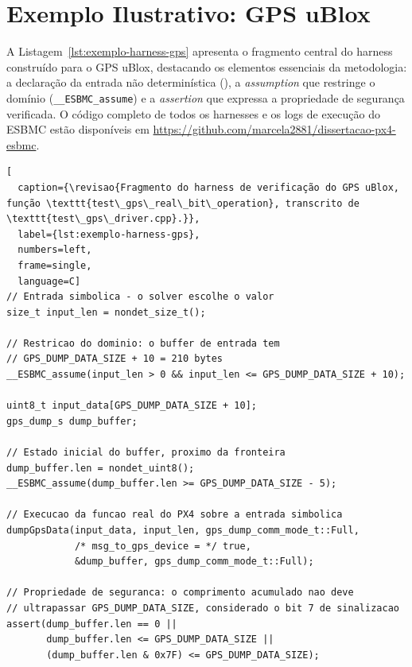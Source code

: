 \section{Exemplo Ilustrativo: GPS uBlox}
\label{sec:exemplo-ilustrativo}


A Listagem~\ref{lst:exemplo-harness-gps} apresenta o fragmento central do harness construído para o GPS uBlox, destacando os elementos essenciais da metodologia: a declaração da entrada não determinística (), a \textit{assumption} que restringe o domínio (\texttt{\_\_ESBMC\_assume}) e a \textit{assertion} que expressa a propriedade de segurança verificada. O código completo de todos os harnesses e os logs de execução do ESBMC estão disponíveis em \url{https://github.com/marcela2881/dissertacao-px4-esbmc}.

\begin{lstlisting}[
  caption={\revisao{Fragmento do harness de verificação do GPS uBlox, função \texttt{test\_gps\_real\_bit\_operation}, transcrito de \texttt{test\_gps\_driver.cpp}.}},
  label={lst:exemplo-harness-gps},
  numbers=left,
  frame=single,
  language=C]
// Entrada simbolica - o solver escolhe o valor
size_t input_len = nondet_size_t();

// Restricao do dominio: o buffer de entrada tem
// GPS_DUMP_DATA_SIZE + 10 = 210 bytes
__ESBMC_assume(input_len > 0 && input_len <= GPS_DUMP_DATA_SIZE + 10);

uint8_t input_data[GPS_DUMP_DATA_SIZE + 10];
gps_dump_s dump_buffer;

// Estado inicial do buffer, proximo da fronteira
dump_buffer.len = nondet_uint8();
__ESBMC_assume(dump_buffer.len >= GPS_DUMP_DATA_SIZE - 5);

// Execucao da funcao real do PX4 sobre a entrada simbolica
dumpGpsData(input_data, input_len, gps_dump_comm_mode_t::Full,
            /* msg_to_gps_device = */ true,
            &dump_buffer, gps_dump_comm_mode_t::Full);

// Propriedade de seguranca: o comprimento acumulado nao deve
// ultrapassar GPS_DUMP_DATA_SIZE, considerado o bit 7 de sinalizacao
assert(dump_buffer.len == 0 ||
       dump_buffer.len <= GPS_DUMP_DATA_SIZE ||
       (dump_buffer.len & 0x7F) <= GPS_DUMP_DATA_SIZE);
\end{lstlisting}

